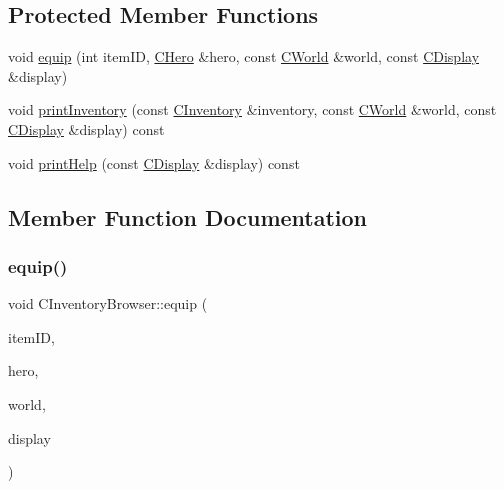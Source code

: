 \subsection*{Protected Member Functions}
\begin{DoxyCompactItemize}
\item 
void \mbox{\hyperlink{class_c_inventory_browser_ac865349ca08d9402c869d8e5450c689a}{equip}} (int item\+ID, \mbox{\hyperlink{class_c_hero}{C\+Hero}} \&hero, const \mbox{\hyperlink{class_c_world}{C\+World}} \&world, const \mbox{\hyperlink{class_c_display}{C\+Display}} \&display)
\item 
void \mbox{\hyperlink{class_c_inventory_browser_a022cb6fc703bd156921816554c7a18b8}{print\+Inventory}} (const \mbox{\hyperlink{class_c_inventory}{C\+Inventory}} \&inventory, const \mbox{\hyperlink{class_c_world}{C\+World}} \&world, const \mbox{\hyperlink{class_c_display}{C\+Display}} \&display) const
\item 
void \mbox{\hyperlink{class_c_inventory_browser_a96d9a928a1931b0df289b91baa3ae071}{print\+Help}} (const \mbox{\hyperlink{class_c_display}{C\+Display}} \&display) const
\end{DoxyCompactItemize}


\subsection{Member Function Documentation}
\mbox{\label{class_c_inventory_browser_ac865349ca08d9402c869d8e5450c689a}} 
\subsubsection{\texorpdfstring{equip()}{equip()}}
{\footnotesize\ttfamily void C\+Inventory\+Browser\+::equip (\begin{DoxyParamCaption}\item[{int}]{item\+ID,  }\item[{\mbox{\hyperlink{class_c_hero}{C\+Hero}} \&}]{hero,  }\item[{const \mbox{\hyperlink{class_c_world}{C\+World}} \&}]{world,  }\item[{const \mbox{\hyperlink{class_c_display}{C\+Display}} \&}]{display }\end{DoxyParamCaption})\hspace{0.3cm}{\ttfamily [protected]}}

